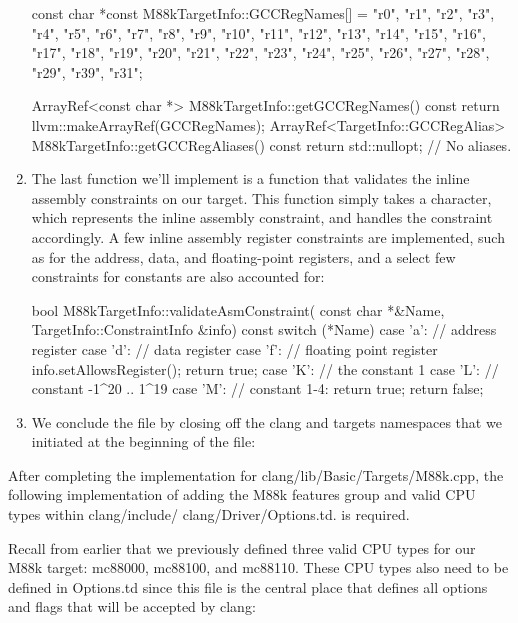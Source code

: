 \begin{enumerate}
\begin{cpp}
const char *const M88kTargetInfo::GCCRegNames[] = {
    "r0", "r1", "r2", "r3", "r4", "r5", "r6", "r7",
    "r8", "r9", "r10", "r11", "r12", "r13", "r14", "r15",
    "r16", "r17", "r18", "r19", "r20", "r21", "r22", "r23",
    "r24", "r25", "r26", "r27", "r28", "r29", "r39", "r31"};

ArrayRef<const char *> M88kTargetInfo::getGCCRegNames() const {
    return llvm::makeArrayRef(GCCRegNames);
}
ArrayRef<TargetInfo::GCCRegAlias>
M88kTargetInfo::getGCCRegAliases() const {
    return std::nullopt; // No aliases.
}
\end{cpp}

\item
The last function we’ll implement is a function that validates the inline assembly constraints on our target. This function simply takes a character, which represents the inline assembly constraint, and handles the constraint accordingly. A few inline assembly register constraints are implemented, such as for the address, data, and floating-point registers, and a select few constraints for constants are also accounted for:

\begin{cpp}
bool M88kTargetInfo::validateAsmConstraint(
const char *&Name, TargetInfo::ConstraintInfo &info) const {
    switch (*Name) {
    case 'a': // address register
    case 'd': // data register
    case 'f': // floating point register
        info.setAllowsRegister();
        return true;
    case 'K': // the constant 1
    case 'L': // constant -1^20 .. 1^19
    case 'M': // constant 1-4:
        return true;
    }
    return false;
}
\end{cpp}

\item
We conclude the file by closing off the clang and targets namespaces that we initiated at the beginning of the file:

\begin{cpp}
} // namespace targets
} // namespace clang
\end{cpp}

\end{enumerate}

After completing the implementation for clang/lib/Basic/Targets/M88k.cpp, the following implementation of adding the M88k features group and valid CPU types within clang/include/ clang/Driver/Options.td. is required.

Recall from earlier that we previously defined three valid CPU types for our M88k target: mc88000, mc88100, and mc88110. These CPU types also need to be defined in Options.td since this file is the central place that defines all options and flags that will be accepted by clang:

